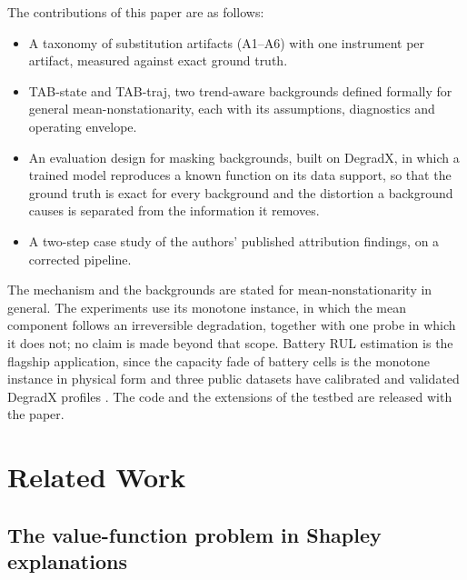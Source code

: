 \documentclass{article}
\begin{document}
The contributions of this paper are as follows:
\begin{itemize}
    \item A taxonomy of substitution artifacts (A1--A6) with one instrument per artifact, measured against exact ground truth.
    \item TAB-state and TAB-traj, two trend-aware backgrounds defined formally for general mean-nonstationarity, each with its assumptions, diagnostics and operating envelope.
    \item An evaluation design for masking backgrounds, built on DegradX, in which a trained model reproduces a known function on its data support, so that the ground truth is exact for every background and the distortion a background causes is separated from the information it removes.
    \item A two-step case study of the authors' published attribution findings, on a corrected pipeline.
\end{itemize}
The mechanism and the backgrounds are stated for mean-nonstationarity in general. The experiments use its monotone instance, in which the mean component follows an irreversible degradation, together with one probe in which it does not; no claim is made beyond that scope. Battery RUL estimation is the flagship application, since the capacity fade of battery cells is the monotone instance in physical form and three public datasets \citep{severson2019data, ma2022real, cui2024data} have calibrated and validated DegradX profiles \citep{degradx2026}. The code and the extensions of the testbed are released with the paper.


\section{Related Work}
\label{sec:related}

\subsection{The value-function problem in Shapley explanations}
\label{sec:related:offmanifold}
\end{document}
